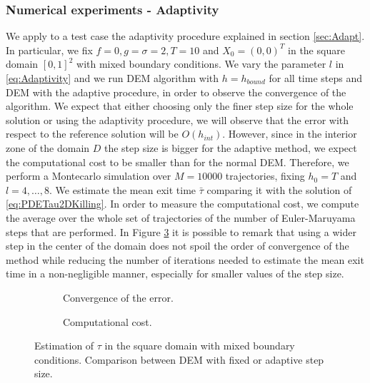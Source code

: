 \subsubsection{Numerical experiments - Adaptivity}
We apply to a test case the adaptivity procedure explained in section \ref{sec:Adapt}. In particular, we fix $f = 0, g = \sigma = 2, T = 10$ and $X_0 = (0,0)^T$ in the square domain $\left[0,1\right]^2$ with mixed boundary conditions. We vary the parameter $l$ in \eqref{eq:Adaptivity} and we run DEM algorithm with $h = h_{bound}$ for all time steps and DEM with the adaptive procedure, in order to observe the convergence of the algorithm. We expect that either choosing only the finer step size for the whole solution or using the adaptivity procedure, we will observe that the error with respect to the reference solution will be $O(h_{int})$. However, since in the interior zone of the domain $D$ the step size is bigger for the adaptive method, we expect the computational cost to be smaller than for the normal DEM. Therefore, we perform a Montecarlo simulation over $M = 10000$ trajectories, fixing $h_0 = T$ and $l = 4, \dots, 8$. We estimate the mean exit time $\bar\tau$ comparing it with the solution of \eqref{eq:PDETau2DKilling}. In order to measure the computational cost, we compute the average over the whole set of trajectories of the number of Euler-Maruyama steps that are performed. In Figure \ref{fig:AdaptResults} it is possible to remark that using a wider step in the center of the domain does not spoil the order of convergence of the method while reducing the number of iterations needed to estimate the mean exit time in a non-negligible manner, especially for smaller values of the step size.

\begin{figure}[t]
    \centering
    \begin{subfigure}{0.49\linewidth}
        \centering
        \resizebox{1\linewidth}{!}{ }  
        \caption{Convergence of the error.}
        \label{fig:AdaptErr}
    \end{subfigure}
    \begin{subfigure}{0.49\linewidth}
        \centering
        \resizebox{1\linewidth}{!}{ }  
        \caption{Computational cost.}
        \label{fig:AdaptCost}
    \end{subfigure}    
    \caption{Estimation of $\tau$ in the square domain with mixed boundary conditions. Comparison between DEM with fixed or adaptive step size.}
    \label{fig:AdaptResults}
\end{figure}

